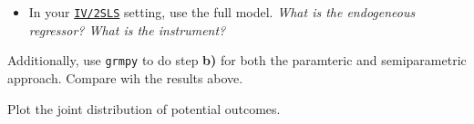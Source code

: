 \begin{boenumerate}
\begin{itemize}
  	\item In your \href{https://bashtage.github.io/linearmodels/doc/iv/introduction.html}{\texttt{IV/2SLS}} setting, use the full model. \emph{What is the endogeneous regressor? What is the instrument?}
  \end{itemize} 
  
  Additionally, use \texttt{grmpy} to do step \textbf{b)} for both the paramteric and semiparametric approach. Compare wih the results above.
  
  \item Plot the joint distribution of potential outcomes.
  

\end{boenumerate}

\nocite{grmpy-1.0}
\nocite{Heckman.2006d}
\nocite{Heckman.2007e}
\nocite{Heckman.2007f}





